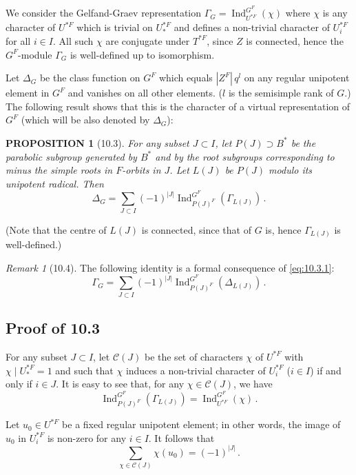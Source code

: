 \documentclass{amsart}
\theoremstyle{plain}
\newtheorem{proposition}[theorem]{PROPOSITION}
\theoremstyle{remark}
\newtheorem{remark}[theorem]{Remark}
\DeclareMathOperator{\Ind}{Ind}
\begin{document}
We consider the Gelfand-Graev representation $\Gamma_G = \Ind_{U^{*F}}^{G^F}(\chi)$ where $\chi$ is any character of $U^{*F}$ which is trivial on $U_*^{*F}$ and defines a non-trivial character of $U_i^{*F}$ for all $i \in I$. All such $\chi$ are conjugate under $T^{*F}$, since $Z$ is connected, hence the $G^F$-module $\Gamma_G$ is well-defined up to isomorphism.

Let $\Delta_G$ be the class function on $G^F$ which equals $|Z^F|\, q^l$ on any regular unipotent element in $G^F$ and vanishes on all other elements. ($l$ is the semisimple rank of $G$.) The following result shows that this is the character of a virtual representation of $G^F$ (which will be also denoted by $\Delta_G$):

\begin{proposition}[10.3]
For any subset $J \subset I$, let $P(J) \supset B^*$ be the parabolic subgroup generated by $B^*$ and by the root subgroups corresponding to minus the simple roots in $F$-orbits in $J$. Let $L(J)$ be $P(J)$ modulo its unipotent radical. Then
\begin{equation}\label{eq:10.3.1}
\Delta_G = \sum_{J \subset I} (-1)^{|J|} \Ind_{P(J)^F}^{G^F}(\Gamma_{L(J)})\,.
\end{equation}
\end{proposition}

(Note that the centre of $L(J)$ is connected, since that of $G$ is, hence $\Gamma_{L(J)}$ is well-defined.)

\begin{remark}[10.4]
The following identity is a formal consequence of \eqref{eq:10.3.1}:
\[
\Gamma_G = \sum_{J \subset I} (-1)^{|J|} \Ind_{P(J)^F}^{G^F}(\Delta_{L(J)})\,.
\]
\end{remark}

\subsection{Proof of 10.3}
For any subset $J \subset I$, let $\mathcal{C}(J)$ be the set of characters $\chi$ of $U^{*F}$ with $\chi \mid U_*^{*F} = 1$ and such that $\chi$ induces a non-trivial character of $U_i^{*F}$ ($i \in I$) if and only if $i \in J$. It is easy to see that, for any $\chi \in \mathcal{C}(J)$, we have
\[
\Ind_{P(J)^F}^{G^F}(\Gamma_{L(J)}) = \Ind_{U^{*F}}^{G^F}(\chi)\,.
\]

Let $u_0 \in U^{*F}$ be a fixed regular unipotent element; in other words, the image of $u_0$ in $U_i^{*F}$ is non-zero for any $i \in I$. It follows that
\[
\sum_{\chi \in \mathcal{C}(J)} \chi(u_0) = (-1)^{|J|}\,.
\]
\end{document}
